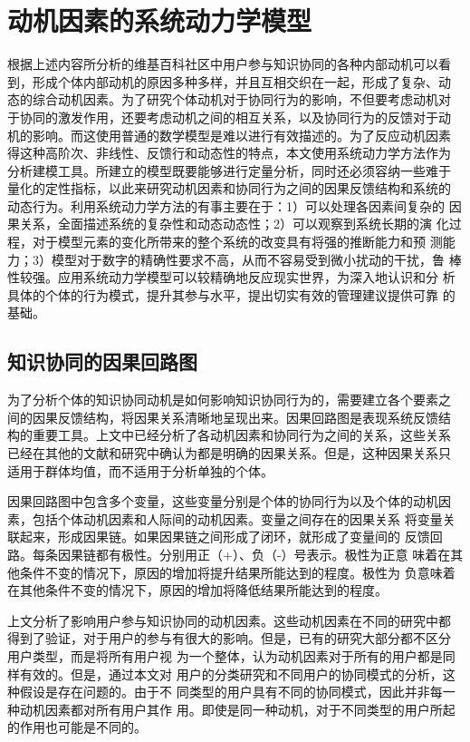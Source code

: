 \section{动机因素的系统动力学模型}
\label{sec:sd-model}
根据上述内容所分析的维基百科社区中用户参与知识协同的各种内部动机可以看
到，形成个体内部动机的原因多种多样，并且互相交织在一起，形成了复杂、动
态的综合动机因素。为了研究个体动机对于协同行为的影响，不但要考虑动机对
于协同的激发作用，还要考虑动机之间的相互关系，以及协同行为的反馈对于动
机的影响。而这使用普通的数学模型是难以进行有效描述的。为了反应动机因素
得这种高阶次、非线性、反馈行和动态性的特点，本文使用系统动力学方法作为
分析建模工具。所建立的模型既要能够进行定量分析，同时还必须容纳一些难于
量化的定性指标，以此来研究动机因素和协同行为之间的因果反馈结构和系统的
动态行为。利用系统动力学方法的有事主要在于：1）可以处理各因素间复杂的
因果关系，全面描述系统的复杂性和动态动态性；2）可以观察到系统长期的演
化过程，对于模型元素的变化所带来的整个系统的改变具有将强的推断能力和预
测能力；3）模型对于数字的精确性要求不高，从而不容易受到微小扰动的干扰，鲁
棒性较强。应用系统动力学模型可以较精确地反应现实世界，为深入地认识和分
析具体的个体的行为模式，提升其参与水平，提出切实有效的管理建议提供可靠
的基础。

\subsection{知识协同的因果回路图}
\label{sec:causality}

为了分析个体的知识协同动机是如何影响知识协同行为的，需要建立各个要素之
间的因果反馈结构，将因果关系清晰地呈现出来。因果回路图是表现系统反馈结
构的重要工具。上文中已经分析了各动机因素和协同行为之间的关系，这些关系
已经在其他的文献和研究中确认为都是明确的因果关系。但是，这种因果关系只
适用于群体均值，而不适用于分析单独的个体。

因果回路图中包含多个变量，这些变量分别是个体的协同行为以及个体的动机因
素，包括个体动机因素和人际间的动机因素。变量之间存在的因果关系
将变量关联起来，形成因果链。如果因果链之间形成了闭环，就形成了变量间的
反馈回路。每条因果链都有极性。分别用正（+）、负（-）号表示。极性为正意
味着在其他条件不变的情况下，原因的增加将提升结果所能达到的程度。极性为
负意味着在其他条件不变的情况下，原因的增加将降低结果所能达到的程度。

上文分析了影响用户参与知识协同的动机因素。这些动机因素在不同的研究中都
得到了验证，对于用户的参与有很大的影响。但是，已有的研究大部分都不区分
用户类型，而是将所有用户视
为一个整体，认为动机因素对于所有的用户都是同样有效的。但是，通过本文对
用户的分类研究和不同用户的协同模式的分析，这种假设是存在问题的。由于不
同类型的用户具有不同的协同模式，因此并非每一种动机因素都对所有用户其作
用。即使是同一种动机，对于不同类型的用户所起的作用也可能是不同的。

